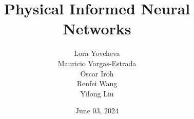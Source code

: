 \documentclass{beamer}
\title{Physical Informed Neural Networks}
\date{June 03, 2024}
\author{Lora Yovcheva\\
Mauricio Vargas-Estrada\\
Oscar Iroh\\
Renfei Wang\\
Yilong Liu}
\begin{document}
\insertTitleSlide

%





%

\insertLastSlide
\end{document}
